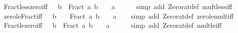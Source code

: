 \begin{isabellebody}
\endisatagproof
{\isafoldproof}%
%
\isadelimproof
\isanewline
%
\endisadelimproof
\isanewline
{}\isamarkupfalse%
\ Fract{\isacharunderscore}{\kern0pt}less{\isacharunderscore}{\kern0pt}zero{\isacharunderscore}{\kern0pt}iff{\isacharcolon}{\kern0pt}\ {\isachardoublequoteopen}{}\ {\isacharless}{\kern0pt}\ b\ {\isasymLongrightarrow}\ Fract\ a\ b\ {\isacharless}{\kern0pt}\ {}\ {\isasymlongleftrightarrow}\ a\ {\isacharless}{\kern0pt}\ {}{\isachardoublequoteclose}\isanewline
%
\isadelimproof
\ \ %
\endisadelimproof
%
\isatagproof
{}\isamarkupfalse%
\ {\isacharparenleft}{\kern0pt}simp\ add{\isacharcolon}{\kern0pt}\ Zero{\isacharunderscore}{\kern0pt}rat{\isacharunderscore}{\kern0pt}def\ mult{\isacharunderscore}{\kern0pt}less{\isacharunderscore}{\kern0pt}{}{\isacharunderscore}{\kern0pt}iff{\isacharparenright}{\kern0pt}%
\endisatagproof
{\isafoldproof}%
%
\isadelimproof
\isanewline
%
\endisadelimproof
\isanewline
{}\isamarkupfalse%
\ zero{\isacharunderscore}{\kern0pt}le{\isacharunderscore}{\kern0pt}Fract{\isacharunderscore}{\kern0pt}iff{\isacharcolon}{\kern0pt}\ {\isachardoublequoteopen}{}\ {\isacharless}{\kern0pt}\ b\ {\isasymLongrightarrow}\ {}\ {\isasymle}\ Fract\ a\ b\ {\isasymlongleftrightarrow}\ {}\ {\isasymle}\ a{\isachardoublequoteclose}\isanewline
%
\isadelimproof
\ \ %
\endisadelimproof
%
\isatagproof
{}\isamarkupfalse%
\ {\isacharparenleft}{\kern0pt}simp\ add{\isacharcolon}{\kern0pt}\ Zero{\isacharunderscore}{\kern0pt}rat{\isacharunderscore}{\kern0pt}def\ zero{\isacharunderscore}{\kern0pt}le{\isacharunderscore}{\kern0pt}mult{\isacharunderscore}{\kern0pt}iff{\isacharparenright}{\kern0pt}%
\endisatagproof
{\isafoldproof}%
%
\isadelimproof
\isanewline
%
\endisadelimproof
\isanewline
{}\isamarkupfalse%
\ Fract{\isacharunderscore}{\kern0pt}le{\isacharunderscore}{\kern0pt}zero{\isacharunderscore}{\kern0pt}iff{\isacharcolon}{\kern0pt}\ {\isachardoublequoteopen}{}\ {\isacharless}{\kern0pt}\ b\ {\isasymLongrightarrow}\ Fract\ a\ b\ {\isasymle}\ {}\ {\isasymlongleftrightarrow}\ a\ {\isasymle}\ {}{\isachardoublequoteclose}\isanewline
%
\isadelimproof
\ \ %
\endisadelimproof
%
\isatagproof
{}\isamarkupfalse%
\ {\isacharparenleft}{\kern0pt}simp\ add{\isacharcolon}{\kern0pt}\ Zero{\isacharunderscore}{\kern0pt}rat{\isacharunderscore}{\kern0pt}def\ mult{\isacharunderscore}{\kern0pt}le{\isacharunderscore}{\kern0pt}{}{\isacharunderscore}{\kern0pt}iff{\isacharparenright}{\kern0pt}%

\end{isabellebody}
